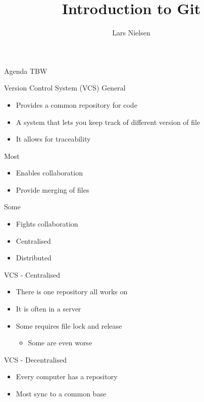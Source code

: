 \documentclass[table,svgnames,aspectratio=169]{beamer}
\author{Lars Nielsen}
\date{}
\title{Introduction to Git}
\begin{document}


\begin{frame}[label={sec:org0b52e43}]{Agenda}
TBW
\end{frame}

\begin{frame}[label={sec:org0912c8f}]{Version Control System (VCS)}
\alert{General}

\begin{itemize}
\item Provides a common repository for code
\item A system that lets you keep track of different version of file
\item It allows for traceability
\end{itemize}

\alert{Most} 

\begin{itemize}
\item Enables collaboration
\item Provide merging of files
\end{itemize}

\alert{Some} 

\begin{itemize}
\item Fights collaboration
\item Centralised
\item Distributed
\end{itemize}
\end{frame}

\begin{frame}[label={sec:org723e529}]{VCS - Centralised}
\begin{itemize}
\item There is one repository all works on
\item It is often in a server
\item Some requires file lock and release
\begin{itemize}
\item Some are even worse
\end{itemize}
\end{itemize}
\end{frame}

\begin{frame}[label={sec:org3708ea4}]{VCS - Decentralised}
\begin{itemize}
\item Every computer has a repository
\item \alert{Most} sync to a common base
\end{itemize}
\end{frame}
\end{document}
